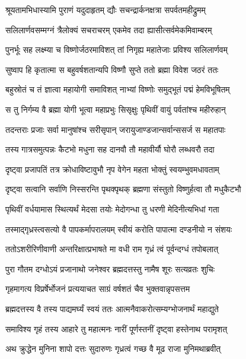 \twolineshloka
{श्रूयतामभिधास्यामि पुराणं यदुदाहृतम्}
{द्यौः सचन्द्रार्कनक्षत्रा सपर्वतमहीद्रुमम्}%

\twolineshloka
{सलिलार्णवसम्मग्नं त्रैलोक्यं सचराचरम्}
{एकमेव तदा ह्यासीत्सर्वमेकमिवाम्बरम्}%

\twolineshloka
{पुनर्भूः सह लक्ष्म्या च विष्णोर्जठरमाविशत्}
{तां निगृह्य महातेजाः प्रविश्य सलिलार्णवम्}%

\twolineshloka
{सुष्वाप हि कृतात्मा स बहुवर्षशतान्यपि}
{विष्णौ सुप्ते ततो ब्रह्मा विवेश जठरं ततः}%

\twolineshloka
{बहुस्रोतं च तं ज्ञात्वा महायोगी समाविशत्}
{नाभ्यां विष्णोः समुद्भूतं पद्मं हेमविभूषितम्}%

\twolineshloka
{स तु निर्गम्य वै ब्रह्मा योगी भूत्वा महाप्रभुः}
{सिसृक्षुः पृथिवीं वायुं पर्वतांश्च महीरुहान्}%

\twolineshloka
{तदन्तराः प्रजाः सर्वा मानुषांश्च सरीसृपान्}
{जरायुजाण्डजान्सर्वान्ससर्ज स महातपाः}%

\twolineshloka
{तस्य गात्रसमुत्पन्नः कैटभो मधुना सह}
{दानवौ तौ महावीर्यौ घोरौ लब्धवरौ तदा}%

\twolineshloka
{दृष्ट्वा प्रजापतिं तत्र क्रोधाविष्टावुभौ नृप}
{वेगेन महता भोक्तुं स्वयम्भुवमधावताम्}%

\twolineshloka
{दृष्ट्वा सत्वानि सर्वाणि निस्सरन्ति पृथक्पृथक्}
{ब्रह्मणा संस्तुतो विष्णुर्हत्वा तौ मधुकैटभौ}%

\twolineshloka
{पृथिवीं वर्धयामास स्थित्यर्थं मेदसा तयोः}
{मेदोगन्धा तु धरणी मेदिनीत्यभिधां गता}%

\twolineshloka
{तस्माद्गृध्रस्त्वसत्यो वै पापकर्मापरालयम्}
{स्वीयं करोति पापात्मा दण्डनीयो न संशयः}%

\twolineshloka
{ततोऽशरीरिणीवाणी अन्तरिक्षात्प्रभाषते}
{मा वधी राम गृध्रं त्वं पूर्वन्दग्धं तपोबलात्}%

\twolineshloka
{पुरा गौतम दग्धोऽयं प्रजानाथो जनेश्वर}
{ब्रह्मदत्तस्तु नामैष शूरः सत्यव्रतः शुचिः}%

\twolineshloka
{गृहमागत्य विप्रर्षेर्भोजनं प्रत्ययाचत}
{साग्रं वर्षशतं चैव भुक्तवान्नृपसत्तम}%

\twolineshloka
{ब्रह्मदत्तस्य वै तस्य पाद्यमर्घ्यं स्वयं ततः}
{आत्मनैवाकरोत्सम्यग्भोजनार्थं महाद्युते}%

\twolineshloka
{समाविश्य गृहं तस्य आहारे तु महात्मनः}
{नारीं पूर्णस्तनीं दृष्ट्वा हस्तेनाथ परामृशत्}%

\twolineshloka
{अथ क्रुद्धेन मुनिना शापो दत्तः सुदारुणः}
{गृध्रत्वं गच्छ वै मूढ राजा मुनिमथाब्रवीत्}%

